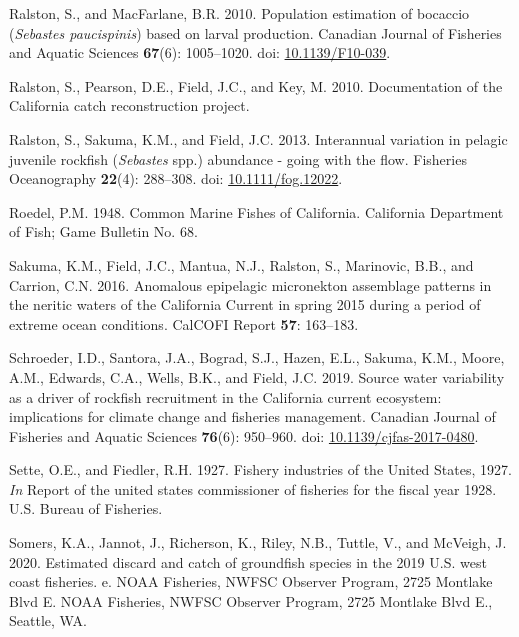\documentclass[
  english,
  a4paper,
]{article}
\newlength{\cslhangindent}
\newlength{\cslentryspacingunit} %
\newenvironment{CSLReferences}[2] %
 {%
  \setlength{\parindent}{0pt}
  \ifodd #1
  \let\oldpar\par
  \def\par{\hangindent=\cslhangindent\oldpar}
  \fi
  \setlength{\parskip}{#2\cslentryspacingunit}
 }%
 {}
\begin{document}
\begin{CSLReferences}{1}{0}
\leavevmode{}%
Ralston, S., and MacFarlane, B.R. 2010. {Population estimation of bocaccio (\emph{Sebastes paucispinis}) based on larval production}. Canadian Journal of Fisheries and Aquatic Sciences \textbf{67}(6): 1005--1020. doi: \href{https://doi.org/10.1139/F10-039}{10.1139/F10-039}.

\leavevmode{}%
Ralston, S., Pearson, D.E., Field, J.C., and Key, M. 2010. {Documentation of the California catch reconstruction project}.

\leavevmode{}%
Ralston, S., Sakuma, K.M., and Field, J.C. 2013. {Interannual variation in pelagic juvenile rockfish (\emph{Sebastes} spp.) abundance - going with the flow}. Fisheries Oceanography \textbf{22}(4): 288--308. doi: \href{https://doi.org/10.1111/fog.12022}{10.1111/fog.12022}.

\leavevmode{}%
Roedel, P.M. 1948. {Common Marine Fishes of California}. California Department of Fish; Game Bulletin No. 68.

\leavevmode{}%
Sakuma, K.M., Field, J.C., Mantua, N.J., Ralston, S., Marinovic, B.B., and Carrion, C.N. 2016. {Anomalous epipelagic micronekton assemblage patterns in the neritic waters of the California Current in spring 2015 during a period of extreme ocean conditions}. CalCOFI Report \textbf{57}: 163--183.

\leavevmode{}%
Schroeder, I.D., Santora, J.A., Bograd, S.J., Hazen, E.L., Sakuma, K.M., Moore, A.M., Edwards, C.A., Wells, B.K., and Field, J.C. 2019. {Source water variability as a driver of rockfish recruitment in the California current ecosystem: implications for climate change and fisheries management}. Canadian Journal of Fisheries and Aquatic Sciences \textbf{76}(6): 950--960. doi: \href{https://doi.org/10.1139/cjfas-2017-0480}{10.1139/cjfas-2017-0480}.

\leavevmode{}%
Sette, O.E., and Fiedler, R.H. 1927. {Fishery industries of the United States, 1927}. \emph{In} Report of the united states commissioner of fisheries for the fiscal year 1928. U.S. Bureau of Fisheries.

\leavevmode{}%
Somers, K.A., Jannot, J., Richerson, K., Riley, N.B., Tuttle, V., and McVeigh, J. 2020. {Estimated discard and catch of groundfish species in the 2019 U.S. west coast fisheries. e}. NOAA Fisheries, NWFSC Observer Program, 2725 Montlake Blvd E. NOAA Fisheries, NWFSC Observer Program, 2725 Montlake Blvd E., Seattle, WA.


\end{CSLReferences}
\end{document}
